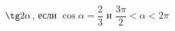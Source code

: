 \begin{ex}[type=simplify_calculate]
	\begin{condition}
		\( \tg2\alpha \), \quad если \( \cos\alpha=\dfrac{2}{3} \) и \( \dfrac{3\pi}{2}<\alpha<2\pi \)
	\end{condition}
\end{ex}